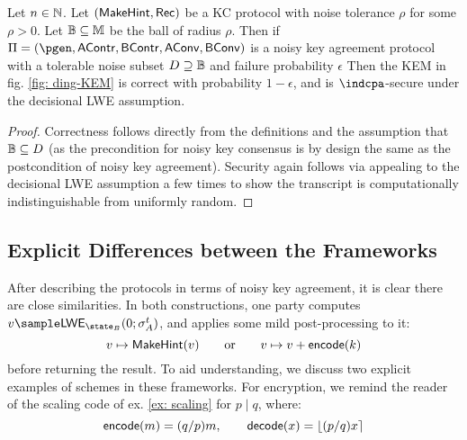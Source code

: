 \begin{theorem}
	Let $n\in\mathbb{N}$.
	Let $(\mathsf{MakeHint}, \mathsf{Rec})$ be a KC protocol with noise tolerance $\rho$ for some $\rho > 0$.
	Let $\mathbb{B}\subseteq \mathbb{M}$ be the ball of radius $\rho$.
	Then if $\Pi = (\pgen, \mathsf{AContr}, \mathsf{BContr}, \mathsf{AConv}, \mathsf{BConv})$ is a noisy key agreement protocol with a tolerable noise subset $D\supseteq \mathbb{B}$ and failure probability $\epsilon$
	Then the KEM in fig. \ref{fig: ding-KEM} is correct with probability $1-\epsilon$, and is $\indcpa$-secure under the decisional LWE assumption.
\end{theorem}
\begin{proof}
Correctness follows directly from the definitions and the assumption that $\mathbb{B}\subseteq D$ (as the precondition for noisy key consensus is by design the same as the postcondition of noisy key agreement).
Security again follows via appealing to the decisional LWE assumption a few times to show the transcript is computationally indistinguishable from uniformly random.	
\end{proof}

\subsection{Explicit Differences between the Frameworks}
After describing the protocols in terms of noisy key agreement, it is clear there are close similarities.
In both constructions, one party computes $v\sample \LWE_{\state_B}(0; \sigma_A^t)$, and applies some mild post-processing to it:
\begin{equation*}
v\mapsto \mathsf{MakeHint}(v)\qquad\text{or}\qquad v\mapsto v + \mathsf{encode}(k)
\end{equation*}
before returning the result.
To aid understanding, we discuss two explicit examples of schemes in these frameworks.
For encryption, we remind the reader of the scaling code of ex. \ref{ex: scaling} for $p\mid q$, where:
\begin{equation*}
\mathsf{encode}(m) = (q/p)m,\qquad \mathsf{decode}(x) = \left\lfloor(p/q)x\right\rceil
\end{equation*}

